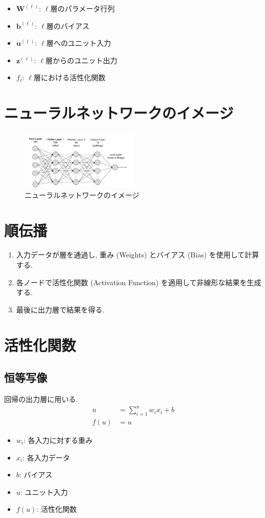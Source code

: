 \documentclass[dvipdfmx, 10pt]{jsarticle}
\begin{document}
\begin{itemize}
    \item $\mathbf{W}^{(\ell)}$: $\ell$層のパラメータ行列
    \item $\mathbf{b}^{(\ell)}$: $\ell$層のバイアス
    \item $\mathbf{u}^{(\ell)}$: $\ell$層へのユニット入力
    \item $\mathbf{z}^{(\ell)}$: $\ell$層からのユニット出力
    \item $f_{\ell}$: $\ell$層における活性化関数
\end{itemize}

\section*{ニューラルネットワークのイメージ}
\begin{figure}[H]
    \centering
    \includegraphics[width=0.5\textwidth]{NN_example.png}
    \caption{ニューラルネットワークのイメージ}
\end{figure}

\section*{順伝播}
\begin{enumerate}
    \item 入力データが層を通過し, 重み (Weights) とバイアス (Bias) を使用して計算する. 
    \item 各ノードで活性化関数 (Activation Function) を適用して非線形な結果を生成する. 
    \item 最後に出力層で結果を得る. 
\end{enumerate}

\section*{活性化関数}
\subsection*{恒等写像}
回帰の出力層に用いる. 
\begin{align*}
    u &= \sum_{i=1}^n w_i x_i + b \\
    f(u) &= u
\end{align*}
\begin{itemize}
    \item $w_i$: 各入力に対する重み
    \item $x_i$: 各入力データ
    \item $b$: バイアス
    \item $u$: ユニット入力
    \item $f(u)$: 活性化関数
\end{itemize}
\end{document}
